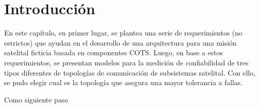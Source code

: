 \section{Introducción}
\begin{comment}
Los proyectos aeroespaciales emplean una arquitectura de aviónica que se denomina \textbf{federada}, en la cual cada computadora del sistema se diseña para que desarrolle una sola función específica \citep{Loveless15}. Esta estrategia de diseño tiene varias ventajas, por tal motivo ha sido utilizada a lo largo de los años. En contraposición, cuenta con varias desventajas, que alientan al surgimiento de nuevas formas de pensamiento y desarrollo de aviónica de sistemas espaciales. Algunas de estas desventajas que ya fueron mencionadas con anterioridad son la masa y una utilización ineficiente de los procesadores. Para ello se está comenzando a desarrollar arquitecturas con el paradigma IMA.
\end{comment}

En este capítulo, en primer lugar, se plantea una serie de requerimientos (no estrictos) que ayudan en el desarrollo de una arquitectura para una misión satelital ficticia basada en componentes COTS. Luego, en base a estos requerimientos, se presentan modelos para la medición de confiabilidad de tres tipos diferentes de topologías de comunicación de subsistemas satelital. Con ello, se pudo elegir cual es la topología que asegura una mayor tolerancia a fallas.

Como siguiente paso 


